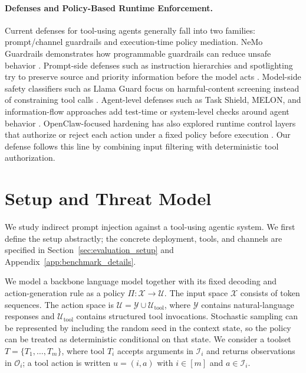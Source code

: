 \documentclass{article}
\begin{document}
\paragraph{Defenses and Policy-Based Runtime Enforcement.}
Current defenses for tool-using agents generally fall into two families: prompt/channel guardrails and execution-time policy mediation. NeMo Guardrails demonstrates how programmable guardrails 
can reduce unsafe behavior \citep{rebedea2023nemo}. 
Prompt-side defenses such as instruction hierarchies and spotlighting try to preserve source and priority information before the model acts \citep{wallace2024instruction,hines2024defending}. 
Model-side safety classifiers such as Llama Guard 
focus on harmful-content screening instead of constraining
tool calls \citep{inan2024llama}.
Agent-level defenses such as Task Shield, MELON, and information-flow approaches add test-time or system-level checks around agent behavior \citep{jia2025task,zhu2025melon,wu2024system}. 
OpenClaw-focused hardening has also explored runtime control layers that authorize or reject each action under a fixed policy before execution \citep{liu2026clawkeeper}. Our defense follows this line by combining 
input filtering with deterministic tool authorization.

\section{Setup and Threat Model}
\label{sec:threat_model}

We study indirect prompt injection against a tool-using agentic system. We first define the setup abstractly; the concrete deployment, tools, and channels are specified in Section~\ref{sec:evaluation_setup} and Appendix~\ref{app:benchmark_details}.

We model a backbone language model together with its fixed decoding and action-generation rule as a policy $\Pi:\mathcal{X}\to\mathcal{U}$. The input space $\mathcal{X}$ consists of token sequences. The action space is $\mathcal{U}=\mathcal{Y}\cup\mathcal{U}_{\mathrm{tool}}$, where $\mathcal{Y}$ contains natural-language responses and $\mathcal{U}_{\mathrm{tool}}$ contains structured tool invocations. Stochastic sampling can be represented by including the random seed in the context state, so the policy can be treated as deterministic conditional on that state. We consider a toolset $T=\{T_1,\ldots,T_m\}$, where tool $T_i$ accepts arguments in $\mathcal{I}_i$ and returns observations in $\mathcal{O}_i$; a tool action is written $u=(i,a)$ with $i\in[m]$ and $a\in\mathcal{I}_i$.
\end{document}
